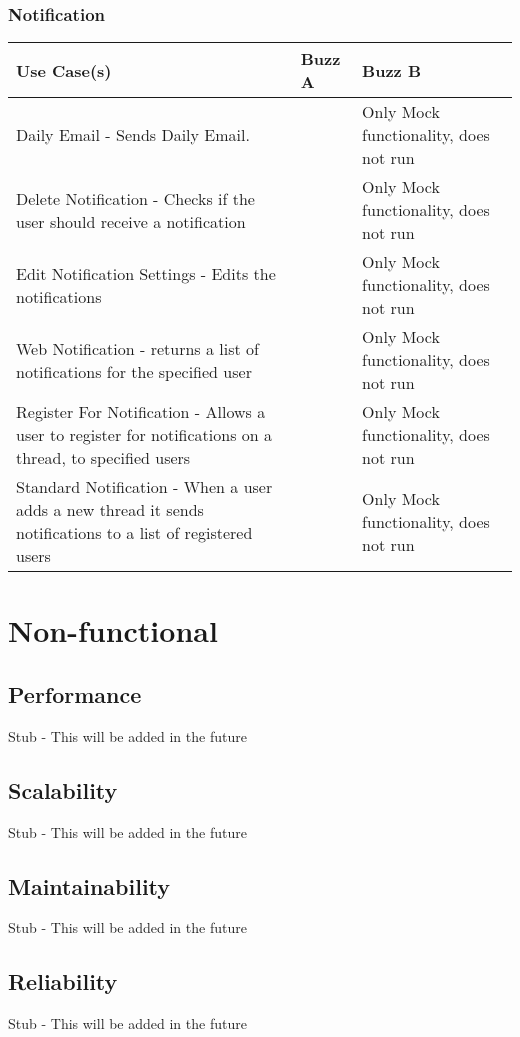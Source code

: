 \documentclass[12pt]{article}
\begin{document}
\subsubsection{Notification}%
\begin{tabular}{|p{4.5cm}|p{4.5cm}|p{4.5cm}|}

\hline
Use Case(s) & Buzz A & Buzz B \\ 
\hline
Daily Email - Sends Daily Email. & & Only Mock functionality, does not run \\ %
\hline
Delete Notification - Checks if the user should receive a notification & & Only Mock functionality, does not run\\ %
\hline
Edit Notification Settings - Edits the notifications  & & Only Mock functionality, does not run\\ %
\hline
Web Notification - returns a list of notifications for the specified user & & Only Mock functionality, does not run \\ %
\hline
Register For Notification - Allows a user to register for notifications on a thread, to specified users  & & Only Mock functionality, does not run \\ %
\hline
Standard Notification - When a user adds a new thread it sends notifications to a list of registered users & &  Only Mock functionality, does not run\\ %
\hline


\end{tabular}
\section{Non-functional} %
\subsection{Performance}
Stub - This will be added in the future
\subsection{Scalability}
Stub - This will be added in the future
\subsection{Maintainability}
Stub - This will be added in the future
\subsection{Reliability}
Stub - This will be added in the future
\end{document}
